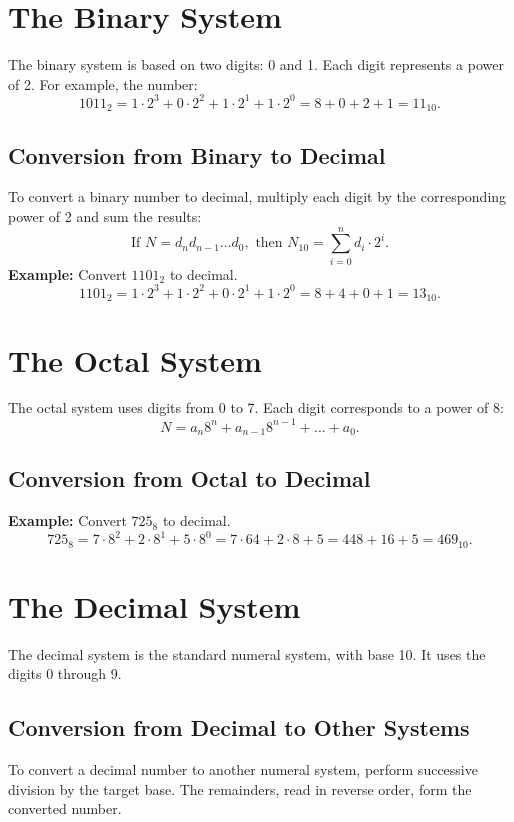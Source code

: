\documentclass[12pt,a4paper]{article}
\begin{document}
\section{The Binary System}
The binary system is based on two digits: 0 and 1. Each digit represents a power of 2. For example, the number:
\[
1011_2 = 1 \cdot 2^3 + 0 \cdot 2^2 + 1 \cdot 2^1 + 1 \cdot 2^0 = 8 + 0 + 2 + 1 = 11_{10}.
\]

\subsection{Conversion from Binary to Decimal}
To convert a binary number to decimal, multiply each digit by the corresponding power of 2 and sum the results:
\[
\text{If } N = d_n d_{n-1}\dots d_0, \text{ then } N_{10} = \sum_{i=0}^{n} d_i \cdot 2^i.
\]
\textbf{Example:} Convert \(1101_2\) to decimal.
\[
1101_2 = 1\cdot2^3 + 1\cdot2^2 + 0\cdot2^1 + 1\cdot2^0 = 8 + 4 + 0 + 1 = 13_{10}.
\]

\section{The Octal System}
The octal system uses digits from 0 to 7. Each digit corresponds to a power of 8:
\[
N = a_n 8^n + a_{n-1} 8^{n-1} + \dots + a_0.
\]

\subsection{Conversion from Octal to Decimal}
\textbf{Example:} Convert \(725_8\) to decimal.
\[
725_8 = 7\cdot8^2 + 2\cdot8^1 + 5\cdot8^0 = 7\cdot64 + 2\cdot8 + 5 = 448 + 16 + 5 = 469_{10}.
\]

\section{The Decimal System}
The decimal system is the standard numeral system, with base 10. It uses the digits 0 through 9.

\subsection{Conversion from Decimal to Other Systems}
To convert a decimal number to another numeral system, perform successive division by the target base. The remainders, read in reverse order, form the converted number.
\end{document}
